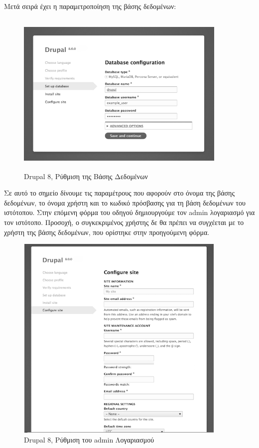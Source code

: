 \documentclass[12pt]{report}
\begin{document}
Μετά σειρά έχει η παραμετροποίηση της βάσης δεδομένων:
\begin{figure}[H]
\centering
\includegraphics[width=0.9\textwidth, height=8cm]{drupal-database-configuration-gray}
\caption{\textlatin{Drupal 8}, Ρύθμιση της Βάσης Δεδομένων}
\label{fig:drupal_db}
\end{figure}

Σε αυτό το σημείο δίνουμε τις παραμέτρους που αφορούν στο όνομα της βάσης δεδομένων, το όνομα χρήστη και το κωδικό πρόσβασης για τη βάση δεδομένων του ιστότοπου. Στην επόμενη φόρμα του οδηγού δημιουργούμε τον \textlatin{admin} λογαριασμό για τον ιστότοπο. Προσοχή, ο συγκεκριμένος χρήστης δε θα πρέπει να συγχέεται με το χρήστη της βάσης δεδομένων, που ορίστηκε στην προηγούμενη φόρμα.
\begin{figure}[H]
\centering
\includegraphics[width=0.9\textwidth, height=10cm]{drupal-site-configuration-gray}
\caption{\textlatin{Drupal 8}, Ρύθμιση του \textlatin{admin} Λογαριασμού}
\label{fig:drupal_admin}
\end{figure}
\end{document}
